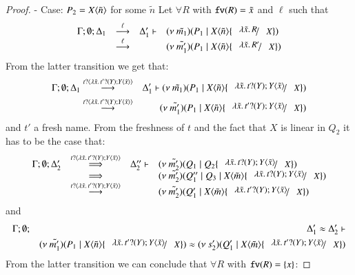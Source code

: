 \begin{proof}

	\noi - Case: $P_2 = X\langle \tilde{n} \rangle$ for some $\tilde{n}$
%
	Let $\forall R$ with $\mathtt{fv}(R) = \tilde{x}$ and $\ell$ such that
%
\[
	\mhorel{\Gamma}{\Delta_1}{\newsp{\tilde{m_1}}{P_1 \Par \appl{X}{\tilde{n}} \subst{\abs{\tilde{x}}{R}}{X}}}{\by{\ell}}
	{\Delta_1'}{}{\newsp{\tilde{m_1'}}{P_1 \Par \appl{X}{\tilde{n}} \subst{\abs{\tilde{x}}{R'}}{X}}}
\]
%
	\noi From the latter transition we get that:
%
	\begin{eqnarray}
		\Gamma; \es; \Delta_1 &\by{\bactinp{t}{\abs{\tilde{x}}{\binp{t'}{Y} \appl{Y}{\tilde{x}}}}}& \Delta_1' \proves
		\newsp{\tilde{m_1}}{P_1 \Par \appl{X}{\tilde{n}} \subst{\abs{\tilde{x}}{\binp{t}{Y} \appl{Y}{\tilde{x}}}}{X}} \nonumber \\
		&\by{\bactinp{t}{\abs{\tilde{x}}{\binp{t'}{Y} \appl{Y}{\tilde{x}}}}}& 
		\newsp{\tilde{m_1'}}{P_1 \Par \appl{X}{\tilde{n}} \subst{\abs{\tilde{x}}{\binp{t'}{Y} \appl{Y}{\tilde{x}}}}{X}}
		\label{lem:subst_equiv5}
	\end{eqnarray}
%
	\noi and $t'$ a fresh name. From the freshness of $t$ and the fact that $X$ is linear in $Q_2$
	it has to be the case that:
%
\[
	\begin{array}{rcll}
		\Gamma; \es; \Delta_2' &\By{\bactinp{t}{\abs{\tilde{x}}{\binp{t'}{Y} \appl{Y}{\tilde{x}}}}}& \Delta_2'' \proves &
		\newsp{\tilde{m_2'}}{Q_1 \Par Q_2 \subst{\abs{\tilde{x}}{\binp{t}{Y} \appl{Y}{\tilde{x}}}}{X}}\\
		&\By{}& &
		\newsp{\tilde{m_2'}}{Q_1'' \Par Q_3 \Par \appl{X}{\tilde{m}} \subst{\abs{\tilde{x}}{\binp{t}{Y} \appl{Y}{\tilde{x}}}}{X}} \\
		&\by{\bactinp{t}{\abs{\tilde{x}}{\binp{t'}{Y} \appl{Y}{\tilde{x}}}}}& &
		\newsp{\tilde{m_2'}}{Q_1' \Par \appl{X}{\tilde{m}} \subst{\abs{\tilde{x}}{\binp{t'}{Y} \appl{Y}{\tilde{x}}}}{X}} \\
	\end{array}
\]
%
	\noi and
%
	\begin{eqnarray}
		\Gamma; \es; &&\Delta_1' \wb \Delta_2' \proves \nonumber \\
		&&\newsp{\tilde{m_1'}}{P_1 \Par \appl{X}{\tilde{n}} \subst{\abs{\tilde{x}}{\binp{t'}{Y} \appl{Y}{\tilde{x}}}}{X}} \wb
		\newsp{s_2'}{Q_1' \Par \appl{X}{\tilde{m}} \subst{\abs{\tilde{x}}{\binp{t'}{Y} \appl{Y}{\tilde{x}}}}{X}}
		\label{lem:subst_equiv6}
	\end{eqnarray} 
%
	\noi From the latter transition we can conclude that $\forall R$ with $\mathtt{fv}(R) = \{x\}$:

\end{proof}
